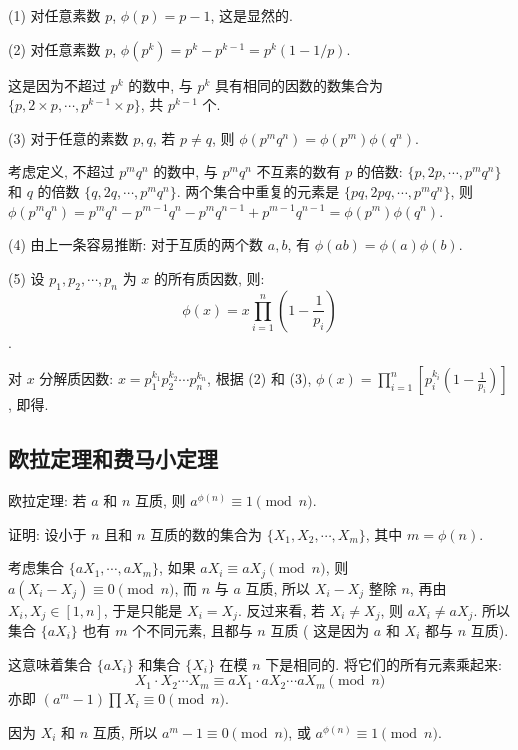 \noindent (1) 对任意素数 $ p $, $ \phi(p) = p - 1 $, 这是显然的.

\noindent (2) 对任意素数 $ p $, $ \phi(p^k) = p^k - p^{k-1} = p^k(1-1/p) $. 

这是因为不超过 $ p^k $ 的数中, 与 $ p^k $ 具有相同的因数的数集合为 $ \{ p, 2\times p, \cdots, p^{k-1}\times p \} $, 共 $ p^{k-1} $ 个. 

\noindent (3) 对于任意的素数 $ p, q $, 若 $ p \neq q $, 则 $ \phi(p^mq^n) = \phi(p^m)\phi(q^n) $. 

考虑定义, 不超过 $ p^mq^n $ 的数中, 与 $ p^mq^n $ 不互素的数有 $ p $ 的倍数: $ \{p,2p,\cdots,p^mq^n\} $ 和 $ q $ 的倍数 $ \{q,2q,\cdots,p^mq^n\} $. 两个集合中重复的元素是 $ \{pq, 2pq, \cdots, p^mq^n \} $, 则 $ \phi(p^mq^n) = p^mq^n - p^{m-1}q^{n} - p^{m}q^{n-1} + p^{m-1}q^{n-1} = \phi(p^m)\phi(q^n) $.

\noindent (4) 由上一条容易推断: 对于互质的两个数 $ a, b $, 有 $ \phi(ab) = \phi(a)\phi(b) $.

\noindent (5) 设 $ p_1, p_2, \cdots, p_n $ 为 $ x $ 的所有质因数, 则: $$ \phi(x) = x\prod_{i=1}^{n}{(1-\frac{1}{p_i})} $$.

	对 $ x $ 分解质因数: $ x = p_1^{k_1}p_2^{k_2}\cdots p_n^{k_n} $, 根据 (2) 和 (3), $ \displaystyle \phi(x) = \prod_{i=1}^n\left[p_i^{k_i}(1-\frac{1}{p_i})\right] $, 即得.

\subsection{欧拉定理和费马小定理}

\noindent 欧拉定理: 若 $ a $ 和 $ n $ 互质, 则 $ a^{\phi(n)} \equiv 1 \pmod{n} $. 

\noindent 证明: 设小于 $ n $ 且和 $ n $ 互质的数的集合为 $ \{ X_1, X_2, \cdots, X_m \} $, 其中 $ m = \phi(n) $.

考虑集合 $ \{ aX_1, \cdots, aX_m\} $, 如果 $ aX_i \equiv aX_j \pmod{n} $, 则 $ a(X_i-X_j) \equiv 0 \pmod{n} $, 而 $ n $ 与 $ a $ 互质, 所以 $ X_i - X_j $ 整除 $ n $, 再由 $ X_i, X_j \in [1,n] $, 于是只能是 $ X_i = X_j $. 反过来看, 若 $ X_i \neq X_j $, 则 $ aX_i \neq aX_j $. 所以集合 $ \{aX_i\} $ 也有 $ m $ 个不同元素, 且都与 $ n $ 互质 ( 这是因为 $ a $ 和 $ X_i $ 都与 $ n $ 互质).
 
这意味着集合 $\{aX_i\}$ 和集合 $\{X_i\}$ 在模 $ n $ 下是相同的. 将它们的所有元素乘起来:
$$ X_1\cdot X_2\cdots X_m \equiv aX_1\cdot aX_2\cdots aX_m \pmod{n} $$ 
亦即 $ (a^m - 1)\prod{X_i} \equiv 0 \pmod{n} $.

因为 $ X_i $ 和 $ n $ 互质, 所以 $ a^m - 1 \equiv 0 \pmod{n} $, 或 $ a^{\phi(n)} \equiv 1 \pmod{n} $.

